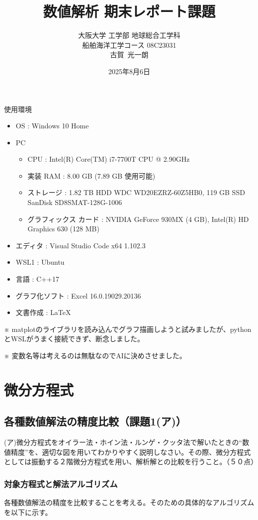 \documentclass[dvipdfmx,a4paper]{jsarticle}
\title{数値解析 期末レポート課題}
\author{大阪大学 工学部 地球総合工学科 \\ 船舶海洋工学コース 08C23031 \\ 古賀\ 光一朗}
\date{2025年8月6日}
\begin{document}
\maketitle

使用環境
\begin{itemize}
    \item OS : Windows 10 Home
    \item PC
    \begin{itemize}
        \item CPU : Intel(R) Core(TM) i7-7700T CPU @ 2.90GHz
        \item 実装 RAM : 8.00 GB (7.89 GB 使用可能)
        \item ストレージ : 1.82 TB HDD WDC WD20EZRZ-60Z5HB0, 119 GB SSD SanDisk SD8SMAT-128G-1006
        \item グラフィックス カード : NVIDIA GeForce 930MX (4 GB), Intel(R) HD Graphics 630 (128 MB)
    \end{itemize}
    \item エディタ : Visual Studio Code x64 1.102.3
    \item WSL1 : Ubuntu
    \item 言語 : C++17
    \item グラフ化ソフト : Excel 16.0.19029.20136
    \item 文書作成 : \LaTeX
\end{itemize}

※ matplotのライブラリを読み込んでグラフ描画しようと試みましたが、pythonとWSLがうまく接続できず、断念しました。

※ 変数名等は考えるのは無駄なのでAIに決めさせました。

\section{微分方程式}

\subsection{各種数値解法の精度比較（課題1(ア)）}

(ア)微分方程式をオイラー法・ホイン法・ルンゲ・クッタ法で解いたときの“数値精度”を、適切な図を用いてわかりやすく説明しなさい。その際、微分方程式としては振動する２階微分方程式を用い、解析解との比較を行うこと。（５０点）

\subsubsection{対象方程式と解法アルゴリズム}
各種数値解法の精度を比較することを考える。そのための具体的なアルゴリズムを以下に示す。
\end{document}
